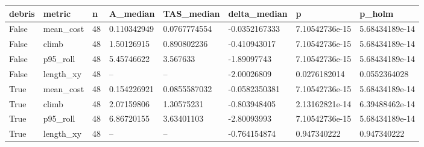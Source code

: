 \begin{tabular}{llllllll}
\hline
debris & metric & n & A\_median & TAS\_median & delta\_median & p & p\_holm \\
\hline
False & mean\_cost & 48 & 0.110342949 & 0.0767774554 & -0.0352167333 & 7.10542736e-15 & 5.68434189e-14 \\
False & climb & 48 & 1.50126915 & 0.890802236 & -0.410943017 & 7.10542736e-15 & 5.68434189e-14 \\
False & p95\_roll & 48 & 5.45746622 & 3.567633 & -1.89097743 & 7.10542736e-15 & 5.68434189e-14 \\
False & length\_xy & 48 & -- & -- & -2.00026809 & 0.0276182014 & 0.0552364028 \\
True & mean\_cost & 48 & 0.154226921 & 0.0855587032 & -0.0582350381 & 7.10542736e-15 & 5.68434189e-14 \\
True & climb & 48 & 2.07159806 & 1.30575231 & -0.803948405 & 2.13162821e-14 & 6.39488462e-14 \\
True & p95\_roll & 48 & 6.86720155 & 3.63401103 & -2.80093993 & 7.10542736e-15 & 5.68434189e-14 \\
True & length\_xy & 48 & -- & -- & -0.764154874 & 0.947340222 & 0.947340222 \\
\hline
\end{tabular}

